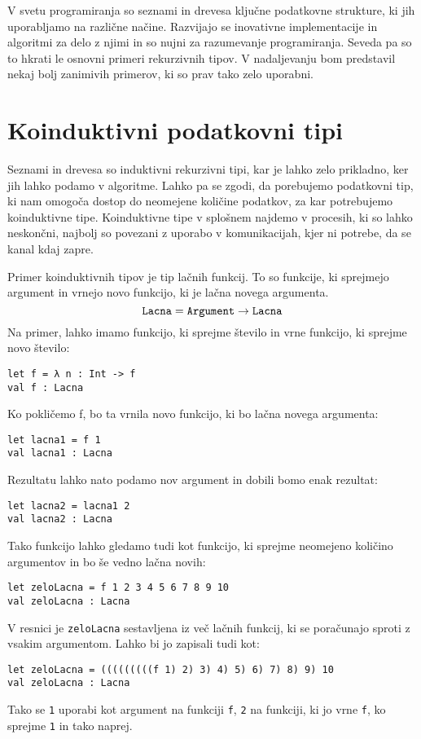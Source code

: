 \documentclass[12pt,a4paper,openany]{book}
\begin{document}
V svetu programiranja so seznami in drevesa ključne podatkovne strukture, ki jih uporabljamo na različne načine. Razvijajo se inovativne implementacije in algoritmi za delo z njimi in so nujni za razumevanje programiranja.
Seveda pa so to hkrati le osnovni primeri rekurzivnih tipov. V nadaljevanju bom predstavil nekaj bolj zanimivih primerov, ki so prav tako zelo uporabni.

\section{Koinduktivni podatkovni tipi}
Seznami in drevesa so induktivni rekurzivni tipi, kar je lahko zelo prikladno, ker jih lahko podamo v algoritme. Lahko pa se zgodi, da porebujemo podatkovni tip, ki nam omogoča dostop do 
neomejene količine podatkov, za kar potrebujemo koinduktivne tipe. Koinduktivne tipe v splošnem najdemo v procesih, ki so lahko neskončni, najbolj so povezani z uporabo v komunikacijah, kjer ni potrebe, da se kanal kdaj zapre.

Primer koinduktivnih tipov je tip lačnih funkcij. To so funkcije, ki sprejmejo argument in vrnejo novo funkcijo, ki je lačna novega argumenta.
\begin{equation}
    \mathtt{Lacna} = \mathtt{Argument} \rightarrow \mathtt{Lacna} \notag
\end{equation}
Na primer, lahko imamo funkcijo, ki sprejme število in vrne funkcijo, ki sprejme novo število:
\begin{lstlisting}
let f = λ n : Int -> f
val f : Lacna  
\end{lstlisting}
Ko pokličemo f, bo ta vrnila novo funkcijo, ki bo lačna novega argumenta:
\begin{lstlisting}
let lacna1 = f 1
val lacna1 : Lacna
\end{lstlisting}
Rezultatu lahko nato podamo nov argument in dobili bomo enak rezultat:
\begin{lstlisting}
let lacna2 = lacna1 2
val lacna2 : Lacna  
\end{lstlisting}
Tako funkcijo lahko gledamo tudi kot funkcijo, ki sprejme neomejeno količino argumentov in bo še vedno lačna novih:
\begin{lstlisting}
let zeloLacna = f 1 2 3 4 5 6 7 8 9 10
val zeloLacna : Lacna
\end{lstlisting}
V resnici je \lstinline{zeloLacna} sestavljena iz več lačnih funkcij, ki se poračunajo sproti z vsakim argumentom. Lahko bi jo zapisali tudi kot:
\begin{lstlisting}
let zeloLacna = (((((((((f 1) 2) 3) 4) 5) 6) 7) 8) 9) 10
val zeloLacna : Lacna
\end{lstlisting}
Tako se \lstinline{1} uporabi kot argument na funkciji \lstinline{f}, \lstinline{2} na funkciji, ki jo vrne \lstinline{f}, ko sprejme \lstinline{1} in tako naprej.
\end{document}
